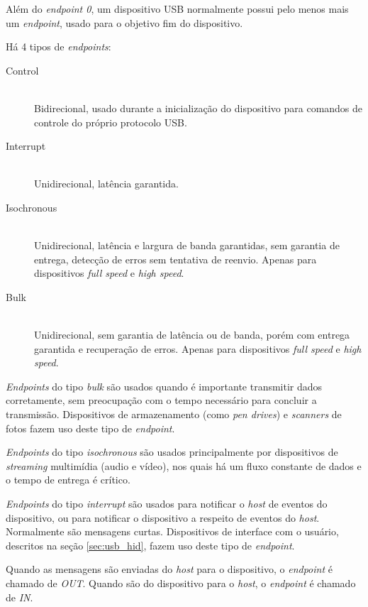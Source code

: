 \documentclass[brazil,pagestart=firstchapter]{abnt}
\begin{document}
Além do \textit{endpoint 0}, um dispositivo \ac{USB} normalmente possui pelo
menos mais um \textit{endpoint}, usado para o objetivo fim do dispositivo.

Há 4 tipos de \textit{endpoints}: \cite[cap.~4]{usbinanutshell}

\begin{description}
\item[Control] \hfill \\
	Bidirecional, usado durante a inicialização do dispositivo para comandos
	de controle do próprio protocolo \ac{USB}.
\item[Interrupt]  \hfill \\
	Unidirecional, latência garantida.
\item[Isochronous] \hfill \\
	Unidirecional, latência e largura de banda garantidas, sem garantia de
	entrega, detecção de erros sem tentativa de reenvio. Apenas para
	dispositivos \textit{full speed} e \textit{high speed}.
\item[Bulk] \hfill \\
	Unidirecional, sem garantia de latência ou de banda, porém com entrega
	garantida e recuperação de erros. Apenas para dispositivos \textit{full
	speed} e \textit{high speed}.
\end{description}

\textit{Endpoints} do tipo \textit{bulk} são usados quando é importante
transmitir dados corretamente, sem preocupação com o tempo necessário para
concluir a transmissão. Dispositivos de armazenamento (como \textit{pen
drives}) e \textit{scanners} de fotos fazem uso deste tipo de
\textit{endpoint}.

\textit{Endpoints} do tipo \textit{isochronous} são usados principalmente
por dispositivos de \textit{streaming} multimídia (audio e vídeo), nos quais
há um fluxo constante de dados e o tempo de entrega é crítico.

\textit{Endpoints} do tipo \textit{interrupt} são usados para notificar o
\textit{host} de eventos do dispositivo, ou para notificar o dispositivo a
respeito de eventos do \textit{host}. Normalmente são mensagens curtas.
Dispositivos de interface com o usuário, descritos na seção
\ref{sec:usb_hid}, fazem uso deste tipo de \textit{endpoint}.

Quando as mensagens são enviadas do \textit{host} para o dispositivo, o
\textit{endpoint} é chamado de \textit{OUT}. Quando são do dispositivo para
o \textit{host}, o \textit{endpoint} é chamado de \textit{IN}.
\end{document}
